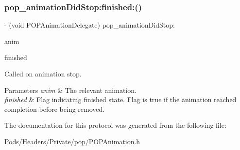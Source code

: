 \subsubsection{\texorpdfstring{pop\+\_\+animation\+Did\+Stop\+:finished\+:()}{pop\_animationDidStop:finished:()}\hspace{0.1cm}{\footnotesize\ttfamily [3/3]}}
{\footnotesize\ttfamily -\/ (void P\+O\+P\+Animation\+Delegate) pop\+\_\+animation\+Did\+Stop\+: \begin{DoxyParamCaption}\item[{(\mbox{\hyperlink{interface_p_o_p_animation}{P\+O\+P\+Animation}} $\ast$)}]{anim }\item[{finished:(B\+O\+OL)}]{finished }\end{DoxyParamCaption}\hspace{0.3cm}{\ttfamily [optional]}}

Called on animation stop. 
\begin{DoxyParams}{Parameters}
{\em anim} & The relevant animation. \\
\hline
{\em finished} & Flag indicating finished state. Flag is true if the animation reached completion before being removed. \\
\hline
\end{DoxyParams}


The documentation for this protocol was generated from the following file\+:\begin{DoxyCompactItemize}
\item 
Pods/\+Headers/\+Private/pop/P\+O\+P\+Animation.\+h\end{DoxyCompactItemize}
